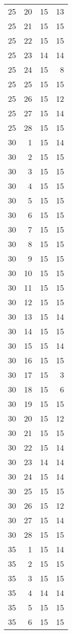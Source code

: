 \documentclass[
]{article}
\begin{document}
\begin{longtable}[]{@{}rrrr@{}}
25 & 20 & 15 & 13 \\
25 & 21 & 15 & 15 \\
25 & 22 & 15 & 15 \\
25 & 23 & 14 & 14 \\
25 & 24 & 15 & 8 \\
25 & 25 & 15 & 15 \\
25 & 26 & 15 & 12 \\
25 & 27 & 15 & 14 \\
25 & 28 & 15 & 15 \\
30 & 1 & 15 & 14 \\
30 & 2 & 15 & 15 \\
30 & 3 & 15 & 15 \\
30 & 4 & 15 & 15 \\
30 & 5 & 15 & 15 \\
30 & 6 & 15 & 15 \\
30 & 7 & 15 & 15 \\
30 & 8 & 15 & 15 \\
30 & 9 & 15 & 15 \\
30 & 10 & 15 & 15 \\
30 & 11 & 15 & 15 \\
30 & 12 & 15 & 15 \\
30 & 13 & 15 & 14 \\
30 & 14 & 15 & 15 \\
30 & 15 & 15 & 14 \\
30 & 16 & 15 & 15 \\
30 & 17 & 15 & 3 \\
30 & 18 & 15 & 6 \\
30 & 19 & 15 & 15 \\
30 & 20 & 15 & 12 \\
30 & 21 & 15 & 15 \\
30 & 22 & 15 & 14 \\
30 & 23 & 14 & 14 \\
30 & 24 & 15 & 14 \\
30 & 25 & 15 & 15 \\
30 & 26 & 15 & 12 \\
30 & 27 & 15 & 14 \\
30 & 28 & 15 & 15 \\
35 & 1 & 15 & 14 \\
35 & 2 & 15 & 15 \\
35 & 3 & 15 & 15 \\
35 & 4 & 14 & 14 \\
35 & 5 & 15 & 15 \\
35 & 6 & 15 & 15 \\

\end{longtable}
\end{document}
